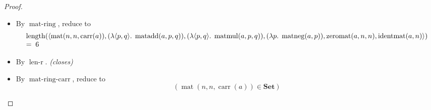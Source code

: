 \documentclass[11pt]{article}
\theoremstyle{plain}
\begin{document}
\begin{proof}
\begin{itemize}[leftmargin=2.8em, itemsep=4pt, parsep=1pt]
\begin{equation*}
\operatorname{zero}(\operatorname{mat\text{-}ring}(a, n)), \operatorname{neg}(\operatorname{mat\text{-}ring}(a, n)), \\ \quad \operatorname{carr}(\operatorname{mat\text{-}ring}(a, n))) \wedge \\ \operatorname{is\text{-}associative}(\operatorname{mul}(\operatorname{mat\text{-}ring}(a, n)), \operatorname{carr}(\operatorname{mat\text{-}ring}(a, n))) \wedge \\ \operatorname{is\text{-}identity}(\operatorname{mul}(\operatorname{mat\text{-}ring}(a, n)), \operatorname{one}(\operatorname{mat\text{-}ring}(a, n)), \operatorname{carr}(\operatorname{mat\text{-}ring}(a, n))) \wedge \\ \operatorname{is\text{-}distributive}(\operatorname{add}(\operatorname{mat\text{-}ring}(a, n)), \operatorname{mul}(\operatorname{mat\text{-}ring}(a, n)), \operatorname{carr}(\operatorname{mat\text{-}ring}(a, n))) \end{array}
\end{equation*}

  \item[\textbf{5--18}] By $\operatorname{mat\text{-}ring}$, reduce to
\begin{equation*}
\begin{array}{@{}l@{}} \operatorname{length}(\langle \operatorname{mat}(n, n, \operatorname{carr}(a)), (\lambda \langle p, q \rangle.\; \operatorname{matadd}(a, p, q)), (\lambda \langle p, q \rangle.\; \operatorname{matmul}(a, p, q)), (\lambda p.\; \operatorname{matneg}(a, p)), \operatorname{zeromat}(a, n, n), \operatorname{identmat}(a, n) \rangle) \\ =\; 6 \end{array}
\end{equation*}

  \item[\textbf{19--20}] By $\operatorname{len\text{-}r}$.  \emph{(closes)}
  \item[\textbf{21}] By $\operatorname{mat\text{-}ring\text{-}carr}$, reduce to
\begin{equation*}
(\operatorname{mat}(n, n, \operatorname{carr}(a)) \in \mathbf{Set})
\end{equation*}


\end{itemize}
\end{proof}
\end{document}
